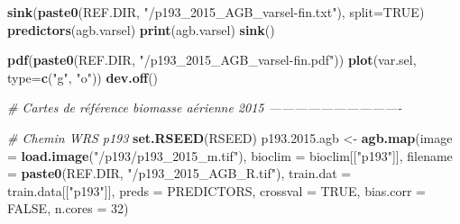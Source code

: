 \documentclass[a4paper, notitlepage, 12pt, krantz2]{krantz}
\newenvironment{Shaded}{\begin{snugshade}}{\end{snugshade}}
\newcommand{\CommentTok}[1]{\textcolor[rgb]{0.56,0.35,0.01}{\textit{#1}}}
\newcommand{\DataTypeTok}[1]{\textcolor[rgb]{0.13,0.29,0.53}{#1}}
\newcommand{\DecValTok}[1]{\textcolor[rgb]{0.00,0.00,0.81}{#1}}
\newcommand{\FloatTok}[1]{\textcolor[rgb]{0.00,0.00,0.81}{#1}}
\newcommand{\KeywordTok}[1]{\textcolor[rgb]{0.13,0.29,0.53}{\textbf{#1}}}
\newcommand{\NormalTok}[1]{#1}
\newcommand{\OtherTok}[1]{\textcolor[rgb]{0.56,0.35,0.01}{#1}}
\newcommand{\StringTok}[1]{\textcolor[rgb]{0.31,0.60,0.02}{#1}}
\begin{document}
\begin{Shaded}
\begin{Highlighting}[]
{{{{\KeywordTok{sink}\NormalTok{(}\KeywordTok{paste0}\NormalTok{(REF.DIR, }\StringTok{"/p193_2015_AGB_varsel-fin.txt"}\NormalTok{), }\DataTypeTok{split=}\OtherTok{TRUE}\NormalTok{)}
\KeywordTok{predictors}\NormalTok{(agb.varsel)}
\KeywordTok{print}\NormalTok{(agb.varsel)}
\KeywordTok{sink}\NormalTok{()}

\KeywordTok{pdf}\NormalTok{(}\KeywordTok{paste0}\NormalTok{(REF.DIR, }\StringTok{"/p193_2015_AGB_varsel-fin.pdf"}\NormalTok{))}
\KeywordTok{plot}\NormalTok{(var.sel, }\DataTypeTok{type=}\KeywordTok{c}\NormalTok{(}\StringTok{"g"}\NormalTok{, }\StringTok{"o"}\NormalTok{))}
\KeywordTok{dev.off}\NormalTok{()}

\CommentTok{# Cartes de référence biomasse aérienne 2015 -------------------------------}

\CommentTok{# Chemin WRS p193}
\KeywordTok{set.RSEED}\NormalTok{(RSEED)}
\NormalTok{p193.}\FloatTok{2015.}\NormalTok{agb <-}\StringTok{ }\KeywordTok{agb.map}\NormalTok{(}\DataTypeTok{image     =} \KeywordTok{load.image}\NormalTok{(}\StringTok{"/p193/p193_2015_m.tif"}\NormalTok{), }
                         \DataTypeTok{bioclim   =}\NormalTok{ bioclim[[}\StringTok{"p193"}\NormalTok{]],}
                         \DataTypeTok{filename  =} \KeywordTok{paste0}\NormalTok{(REF.DIR, }\StringTok{"/p193_2015_AGB_R.tif"}\NormalTok{),}
                         \DataTypeTok{train.dat =}\NormalTok{ train.data[[}\StringTok{"p193"}\NormalTok{]],}
                         \DataTypeTok{preds     =}\NormalTok{ PREDICTORS,}
                         \DataTypeTok{crossval  =} \OtherTok{TRUE}\NormalTok{,}
                         \DataTypeTok{bias.corr =} \OtherTok{FALSE}\NormalTok{,}
                         \DataTypeTok{n.cores   =} \DecValTok{32}\NormalTok{)}

}}}}
\end{Highlighting}
\end{Shaded}
\end{document}
